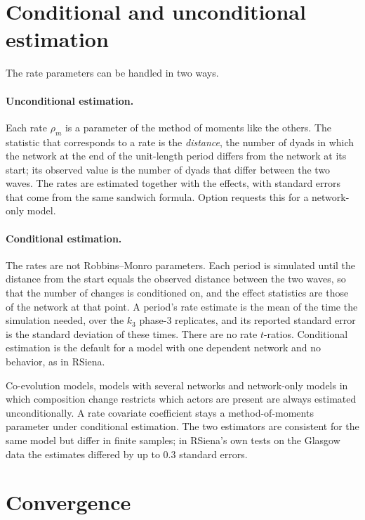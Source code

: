 \section{Conditional and unconditional estimation}

The rate parameters can be handled in two ways.

\paragraph{Unconditional estimation.} Each rate $\rho_m$ is a parameter of the method of moments like the others. The statistic that corresponds to a rate is the \emph{distance}, the number of dyads in which the network at the end of the unit-length period differs from the network at its start; its observed value is the number of dyads that differ between the two waves. The rates are estimated together with the effects, with standard errors that come from the same sandwich formula. Option  requests this for a network-only model.

\paragraph{Conditional estimation.} The rates are not Robbins--Monro parameters. Each period is simulated until the distance from the start equals the observed distance between the two waves, so that the number of changes is conditioned on, and the effect statistics are those of the network at that point. A period's rate estimate is the mean of the time the simulation needed, over the $k_3$ phase-3 replicates, and its reported standard error is the standard deviation of these times. There are no rate $t$-ratios. Conditional estimation is the default for a model with one dependent network and no behavior, as in RSiena.

Co-evolution models, models with several networks and network-only models in which composition change restricts which actors are present are always estimated unconditionally. A rate covariate coefficient stays a method-of-moments parameter under conditional estimation. The two estimators are consistent for the same model but differ in finite samples; in RSiena's own tests on the Glasgow data the estimates differed by up to $0.3$ standard errors.

\section{Convergence}\label{sec:convergence}


